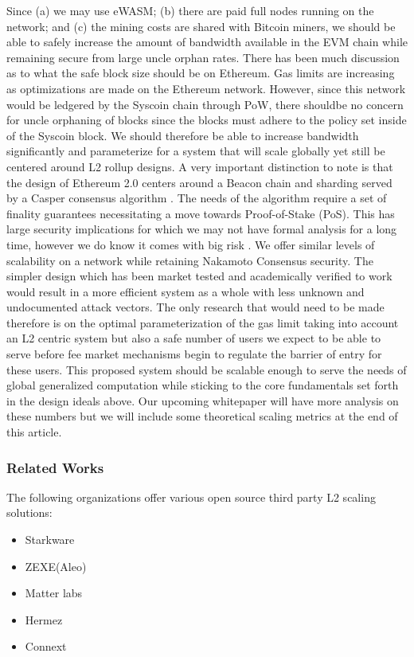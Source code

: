 \documentclass[peerreview]{ieeesyscoin}
\begin{document}
Since (a) we may use eWASM; (b) there are paid full nodes running on the network; and (c) the mining costs are shared with Bitcoin miners, we should be able to safely increase the amount of bandwidth available in the EVM chain while remaining secure from large uncle orphan rates. There has been much discussion as to what the safe block size should be on Ethereum. Gas limits are increasing as optimizations are made on the Ethereum network. However, since this network would be ledgered by the Syscoin chain through PoW, there shouldbe no concern for uncle orphaning of blocks since the blocks must adhere to the policy set inside of the Syscoin block. We should therefore be able to increase bandwidth significantly and parameterize for a system that will scale globally yet still be centered around L2 rollup designs. A very important distinction to note is that the design of Ethereum 2.0 centers around a Beacon chain and sharding served by a Casper consensus algorithm \cite{But17}. The needs of the algorithm require a set of finality guarantees necessitating a move towards Proof-of-Stake (PoS). This has large security implications for which we may not have formal analysis for a long time, however we do know it comes with big risk \cite{Neu21}.  We offer similar levels of scalability on a network while retaining Nakamoto Consensus security. The simpler design which has been market tested and academically verified to work would result in a more efficient system as a whole with less unknown and undocumented attack vectors. The only research that would need to be made therefore is on the optimal parameterization of the gas limit taking into account an L2 centric system but also a safe number of users we expect to be able to serve before fee market mechanisms begin to regulate the barrier of entry for these users. This proposed system should be scalable enough to serve the needs of global generalized computation while sticking to the core fundamentals set forth in the design ideals above. Our upcoming whitepaper will have more analysis on these numbers but we will include some theoretical scaling metrics at the end of this article.

\subsubsection{Related Works}

The following organizations offer various open source third party L2 scaling solutions:

\begin{itemize}
\item Starkware
\item ZEXE(Aleo)
\item Matter labs
\item Hermez
\item Connext
\end{itemize}
\end{document}
